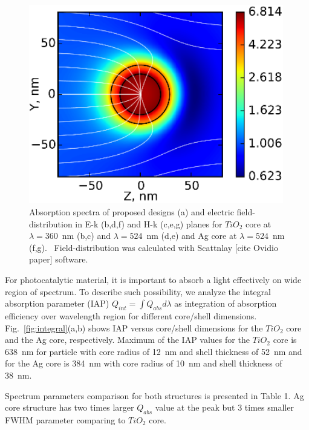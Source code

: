 \documentclass[aip,jap,reprint]{revtex4-1}
\begin{document}
\begin{figure}[!h]
\begin{minipage}[h]{0.235\textwidth}
  \end{minipage}
  \hfill
  \begin{minipage}[h]{0.235\textwidth}
    \includegraphics[width=0.99\textwidth]{3g}
  \end{minipage}%
  \caption{Absorption spectra of proposed
designs (a) and electric field-distribution in E-k (b,d,f) and H-k (c,e,g)
planes for $TiO_2$ core at  $\lambda=360$~nm
(b,c) and $\lambda=524$~nm (d,e) and Ag
core at  $\lambda=524$~nm (f,g).~
Field-distribution was calculated with Scattnlay [cite Ovidio paper]
software. \label{fig:field}}%
\end{figure}

For photocatalytic material, it is important to absorb a light
effectively on wide region of spectrum. To describe such possibility,
we analyze the integral absorption parameter (IAP)
$Q_{int} = \int Q_{abs}d\lambda$
as integration of absorption efficiency over wavelength region for
different core/shell dimensions. Fig.~\ref{fig:integral}(a,b) shows IAP versus
core/shell dimensions for the $TiO_2$
core and the Ag core, respectively.  Maximum of the IAP values for the
$TiO_2$
core is 638~nm for particle with core radius of 12~nm and shell
thickness of 52~nm and for the Ag core is 384~nm with core radius of
10~nm and shell thickness of 38~nm.

Spectrum parameters comparison for both structures is presented in Table
1. Ag core structure has two times larger $Q_{abs}$ value at the peak but 3
times smaller FWHM parameter comparing to $TiO_2$ core.
\end{document}
